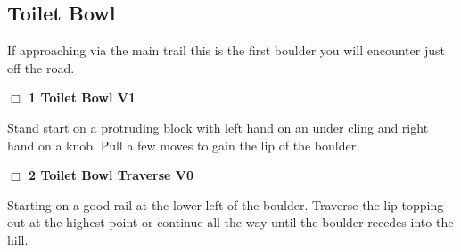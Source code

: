 \begin{multicols}{2}
\needspace{10em}
\subsection*{Toilet Bowl}\label{bf:Toilet Bowl}

If approaching via the main trail this is the first boulder you will encounter just off the road.\\



\needspace{2em}
\label{rt:Toilet Bowl}
\colorbox{green!20}{
\parbox{0.95\linewidth}{
\hspace{-1ex}\textbf{$\Box$
1 Toilet Bowl V1  
}}}
\begin{adjustwidth}{1.3em}{}			

Stand start on a protruding block with left hand on an under cling and right hand on a knob. Pull a few moves to gain the lip of the boulder.
\end{adjustwidth}




\needspace{2em}
\label{rt:Toilet Bowl Traverse}
\colorbox{green!20}{
\parbox{0.95\linewidth}{
\hspace{-1ex}\textbf{$\Box$
2 Toilet Bowl Traverse V0  
}}}
\begin{adjustwidth}{1.3em}{}			

Starting on a good rail at the lower left of the boulder. Traverse the lip topping out at the highest point or continue all the way until the boulder recedes into the hill.
\end{adjustwidth}



	\end{multicols}


